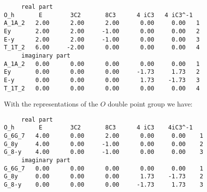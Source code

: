 \documentclass[12pt,a4paper,twoside]{report}
\begin{document}
\begin{tcolorbox}
\begin{footnotesize}
\begin{verbatim}
     real part
O_h       E        3C2       8C3      4 iC3   4 iC3^-1  
A_1A_2   2.00      2.00      2.00      0.00     0.00   1
Ey       2.00      2.00     -1.00      0.00     0.00   2
E-y      2.00      2.00     -1.00      0.00     0.00   3
T_1T_2   6.00     -2.00      0.00      0.00     0.00   4
     imaginary part
A_1A_2   0.00      0.00      0.00      0.00     0.00   1
Ey       0.00      0.00      0.00     -1.73     1.73   2
E-y      0.00      0.00      0.00      1.73    -1.73   3 
T_1T_2   0.00      0.00      0.00      0.00     0.00   4
\end{verbatim}
\end{footnotesize}
\end{tcolorbox}

With the representations of the $O$ double point group we have:

\begin{tcolorbox}
\begin{footnotesize}
\begin{verbatim}
     real part
O_h       E        3C2       8C3      4 iC3    4iC3^-1 
G_6G_7   4.00      0.00      2.00      0.00     0.00    1
G_8y     4.00      0.00     -1.00      0.00     0.00    2
G_8-y    4.00      0.00     -1.00      0.00     0.00    3
     imaginary part
G_6G_7   0.00      0.00      0.00      0.00     0.00    1
G_8y     0.00      0.00      0.00      1.73    -1.73    2
G_8-y    0.00      0.00      0.00     -1.73     1.73    3
\end{verbatim}
\end{footnotesize}
\end{tcolorbox}
\end{document}
